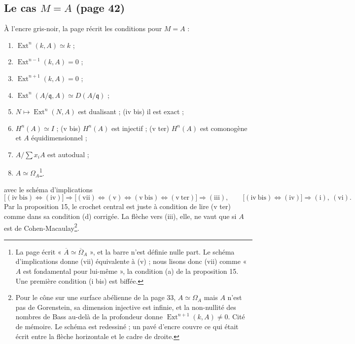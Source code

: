 \documentclass[11pt,a4paper]{article}
\begin{document}
\subsection*{Le cas $M = A$ (page 42)}

À l'encre gris-noir, la page récrit les conditions pour $M = A$ :
\begin{enumerate}
\item[(i)] $\operatorname{Ext}^n(k, A) \simeq k$ ;
\item[(ii)] $\operatorname{Ext}^{n-1}(k, A) = 0$ ;
\item[(iii)] $\operatorname{Ext}^{n+1}(k, A) = 0$ ;
\item[(iii bis)] $\operatorname{Ext}^n(A/\mathfrak{q}, A) \simeq D(A/\mathfrak{q})$ ;
\item[(iv)] $N \mapsto \operatorname{Ext}^n(N, A)$ est dualisant ; (iv bis) il
est exact ;
\item[(v)] $H^n(A) \simeq I$ ; (v bis) $H^n(A)$ est injectif ; (v ter) $H^n(A)$
est comonogène et $A$ équidimensionnel ;
\item[(vi)] $A/\sum x_iA$ est autodual ;
\item[(vii)] $A \simeq \Omega_A$\footnote{La page écrit
« $\overline{A} \simeq \overline{\Omega}_A$ », et la barre n'est définie nulle
part. Le schéma d'implications donne (vii) équivalente à (v) ; nous lisons
donc (vii) comme « $A$ est fondamental pour lui-même », la condition (a) de la
proposition 15. Une première condition (i bis) est biffée.}.
\end{enumerate}
avec le schéma d'implications
\[
  \bigl[(\mathrm{iv\ bis}) \Leftrightarrow (\mathrm{iv})\bigr] \Rightarrow
  \bigl[(\mathrm{vii}) \Leftrightarrow (\mathrm{v}) \Leftrightarrow
  (\mathrm{v\ bis}) \Leftrightarrow (\mathrm{v\ ter})\bigr] \Rightarrow
  (\mathrm{iii}),
  \qquad
  \bigl[(\mathrm{iv\ bis}) \Leftrightarrow (\mathrm{iv})\bigr] \Rightarrow
  (\mathrm{i}),\ (\mathrm{vi}).
\]
Par la proposition 15, le crochet central est juste à condition de lire (v
ter) comme dans sa condition (d) corrigée. La flèche vers (iii), elle, ne vaut
que si $A$ est de Cohen-Macaulay\footnote{Pour le cône sur une surface
abélienne de la page 33, $A \simeq \Omega_A$ mais $A$ n'est pas de
Gorenstein, sa dimension injective est infinie, et la non-nullité des nombres
de Bass au-delà de la profondeur donne $\operatorname{Ext}^{n+1}(k, A) \neq
0$. Cité de mémoire. Le schéma est redessiné ; un pavé d'encre couvre ce qui
était écrit entre la flèche horizontale et le cadre de droite.}.
\end{document}
